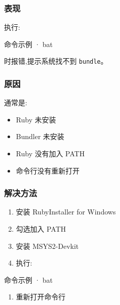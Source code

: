 \documentclass[lang=cn,scheme=chinese,color=blue,device=normal,toc=onecol,math=cm]{elegantbook}
\begin{document}
\subsubsection{表现}


执行:\par


\begin{inlinecodebox}{命令示例 · bat}
\end{inlinecodebox}


时报错,提示系统找不到 \texttt{bundle}。\par


\subsubsection{原因}


通常是:\par


\begin{itemize}
\item Ruby 未安装
\item Bundler 未安装
\item Ruby 没有加入 PATH
\item 命令行没有重新打开
\end{itemize}


\subsubsection{解决方法}


\begin{enumerate}
\item 安装 RubyInstaller for Windows
\item 勾选加入 PATH
\item 安装 MSYS2-Devkit
\item 执行:
\end{enumerate}


\begin{inlinecodebox}{命令示例 · bat}
\end{inlinecodebox}


\begin{enumerate}
\item 重新打开命令行
\end{enumerate}
\end{document}
